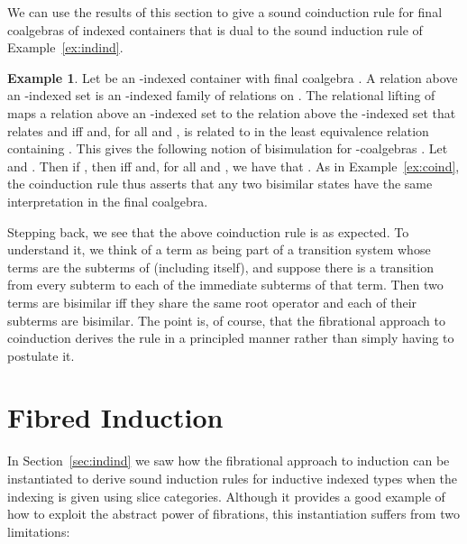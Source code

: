 \documentclass{LMCS}
\theoremstyle{plain}
\theoremstyle{remark}
\theoremstyle{definition}
\newtheorem{example}[theorem]{Example}
\begin{document}
We can use the results of this section to give a sound coinduction rule
for final coalgebras of indexed containers that is dual to the
sound induction rule of Example~\ref{ex:indind}.

\begin{example}\label{ex:coindcont}
  Let  be an -indexed container with final coalgebra
  . A relation above an
  -indexed set  is an -indexed family of relations
   on . The relational lifting of  maps a relation
   above an -indexed set  to the relation  above the
  -indexed set  that relates  and  iff  and, for all  and ,  is related to  in the least
  equivalence relation containing . This gives the following
  notion of bisimulation for -coalgebras .
  Let  and . Then if , then  iff  and, for
  all  and , we have that
  .  As in
  Example~\ref{ex:coind}, the coinduction rule thus asserts that any
  two bisimilar states have the same interpretation in the final
  coalgebra.
\end{example}

Stepping back, we see that the above coinduction rule is as
expected. To understand it, we think of a term  as being
part of a transition system whose terms are the subterms of 
(including  itself), and suppose there is a transition from every
subterm to each of the immediate subterms of that term. Then two terms
are bisimilar iff they share the same root operator and each of their
subterms are bisimilar. The point is, of course, that the fibrational
approach to coinduction derives the rule in a principled manner rather
than simply having to postulate it. 

\section{Fibred Induction}\label{sec:fibind}

In Section~\ref{sec:indind} we saw how the fibrational approach to
induction can be instantiated to derive sound induction rules for
inductive indexed types when the indexing is given using slice
categories. Although it provides a good example of how to exploit the
abstract power of fibrations, this instantiation suffers from two
limitations:

\vspace*{0.1in}
\end{document}
